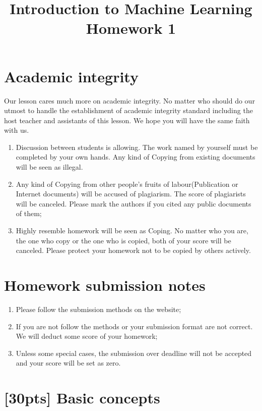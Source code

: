 \documentclass{article}
\title{Introduction to Machine Learning\\ Homework 1}
\begin{document}
	\maketitle
	\section*{Academic integrity}
	Our lesson cares much more on academic integrity. No matter who should do our utmost to handle the establishment of academic integrity standard including the host teacher and assistants of this lesson. We hope you will have the same faith with us.
	\begin{enumerate}[(1)]
        \item Discussion between students is allowing. 
        The work named by yourself must be completed by your own hands. 
        Any kind of Copying from existing documents will be seen as illegal.
        \item Any kind of Copying from other people's fruits of labour(Publication or Internet documents) will be accused of plagiarism. 
        The score of plagiarists will be canceled. 
        Please mark the authors if you cited any public documents of them;
        \item Highly resemble homework will be seen as Coping. 
        No matter who you are, the one who copy or the one who is copied, both of your score will be canceled. 
        Please protect your homework not to be copied by others actively.
    \end{enumerate}

	\section*{Homework submission notes}
    \begin{enumerate}[(1)]
        \item Please follow the submission methods on the website;
        \item If you are not follow the methods or your submission format are not correct. 
        We will deduct some score of your homework;
        \item Unless some special cases, the submission over deadline will not be accepted and your score will be set as zero. 
    \end{enumerate}

    \newpage
    \section{[30pts] Basic concepts}
    \newcommand{\rD}{\mathrm{D}}
    \newcommand{\rT}{\mathrm{T}}
\end{document}
